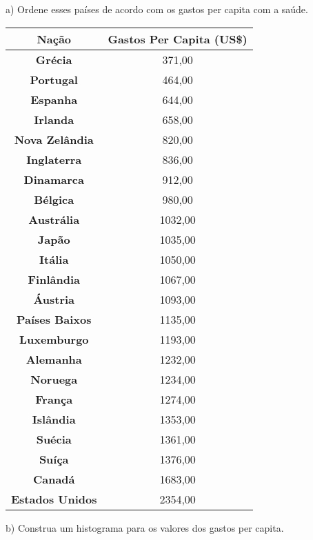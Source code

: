 \documentclass[12pt,a4paper]{article}
\begin{document}
	\vspace{1cm}
	a) Ordene esses países de acordo com os gastos per capita com a saúde.\\
		\begin{center}
		\begin{tabular}{|c|c|} \hline
			\textbf{Nação} & \textbf{Gastos Per Capita (US\$)}\\ \hline
			\textbf{Grécia} & 371,00\\ \hline
			\textbf{Portugal} & 464,00\\ \hline
			\textbf{Espanha} & 644,00\\ \hline
			\textbf{Irlanda} & 658,00\\ \hline
			\textbf{Nova Zelândia} & 820,00\\ \hline
			\textbf{Inglaterra} & 836,00\\ \hline
			\textbf{Dinamarca} & 912,00\\ \hline
			\textbf{Bélgica} & 980,00\\ \hline
			\textbf{Austrália} & 1032,00\\ \hline
			\textbf{Japão} & 1035,00\\ \hline
			\textbf{Itália} & 1050,00\\ \hline
			\textbf{Finlândia} & 1067,00\\ \hline
			\textbf{Áustria} & 1093,00\\ \hline
			\textbf{Países Baixos} & 1135,00\\ \hline
			\textbf{Luxemburgo} & 1193,00\\ \hline
			\textbf{Alemanha} & 1232,00\\ \hline
			\textbf{Noruega} & 1234,00\\ \hline
			\textbf{França} & 1274,00\\ \hline
			\textbf{Islândia} & 1353,00\\ \hline
			\textbf{Suécia} & 1361,00\\ \hline
			\textbf{Suíça} & 1376,00\\ \hline
			\textbf{Canadá} & 1683,00\\ \hline
			\textbf{Estados Unidos} & 2354,00\\ \hline	
		\end{tabular}
	\end{center}
	\vspace{0.5cm}	
	b) Construa um histograma para os valores dos gastos per capita.\\
\end{document}

